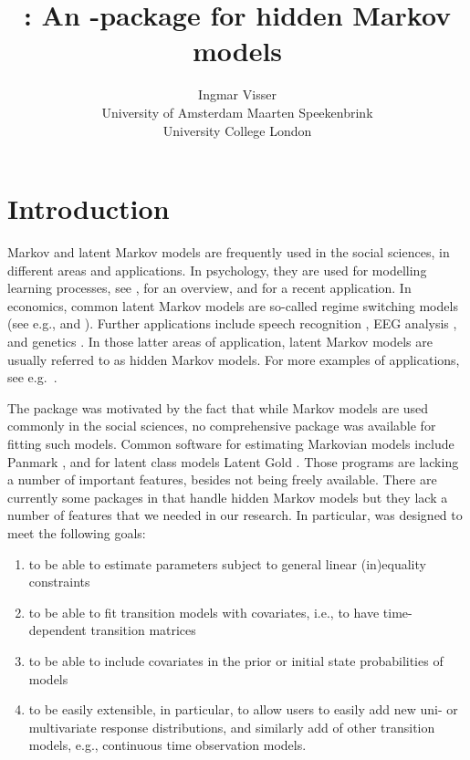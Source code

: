 \documentclass[article]{jss}
\author{Ingmar Visser\\University of Amsterdam \And 
        Maarten Speekenbrink\\University College London}
\title{\pkg{depmixS4} : An \proglang{R}-package for hidden Markov models}
\begin{document}



\section{Introduction}

Markov and latent Markov models are frequently used in the social
sciences, in different areas and applications.  In psychology, they
are used for modelling learning processes, see \citet{Wickens1982},
for an overview, and \citet{Schmittmann2006} for a recent application.
In economics, common latent Markov models are so-called regime
switching models (see e.g., \citealp{Kim1994} and \citealp{Ghysels1994}).
Further applications include speech recognition \citep{Rabiner1989},
EEG analysis \citep{Rainer2000}, and genetics \citep{Krogh1998}.  In
those latter areas of application, latent Markov models are usually
referred to as hidden Markov models. For more examples of applications, 
see e.g.\ \citet[][chapter~1]{Cappe2005}.

The  package was motivated by the fact that while Markov
models are used commonly in the social sciences, no comprehensive
package was available for fitting such models.  Common software for 
estimating Markovian models include Panmark \citep{Pol1996}, and for latent class
models Latent Gold \citep{Vermunt2003}.  Those programs are lacking a
number of important features, besides not being freely available.
There are currently some packages in  that handle hidden Markov
models but they lack a number of features that we needed in our
research. In particular,  was designed to meet the
following goals:

\begin{enumerate}
	
	\item to be able to estimate parameters subject to general
	linear (in)equality constraints
	
	\item to be able to fit transition models with covariates, i.e.,
	to have time-dependent transition matrices
	
	\item to be able to include covariates in the prior or initial
	state probabilities of models
	
	\item to be easily extensible, in particular, to allow users to
  easily add new uni- or multivariate response distributions, and similarly 
  add of other transition models, e.g., continuous time observation
	models.
	
\end{enumerate}
\end{document}
